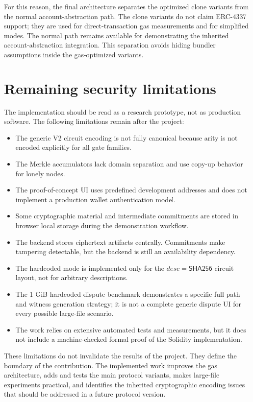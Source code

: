 For this reason, the final architecture separates the optimized clone variants from the
normal account-abstraction path. The clone variants do not claim ERC-4337 support; they are
used for direct-transaction gas measurements and for simplified modes. The normal path
remains available for demonstrating the inherited account-abstraction integration. This
separation avoids hiding bundler assumptions inside the gas-optimized variants.

\section{Remaining security limitations}

The implementation should be read as a research prototype, not as production software. The
following limitations remain after the project:

\begin{itemize}
  \item The generic V2 circuit encoding is not fully canonical because arity is not encoded
  explicitly for all gate families.
  \item The Merkle accumulators lack domain separation and use copy-up behavior for lonely
  nodes.
  \item The proof-of-concept UI uses predefined development addresses and does not implement
  a production wallet authentication model.
  \item Some cryptographic material and intermediate commitments are stored in browser local
  storage during the demonstration workflow.
  \item The backend stores ciphertext artifacts centrally. Commitments make tampering
  detectable, but the backend is still an availability dependency.
  \item The hardcoded mode is implemented only for the \(desc=\mathsf{SHA256}\) circuit
  layout, not for arbitrary descriptions.
  \item The 1 GiB hardcoded dispute benchmark demonstrates a specific full path and witness
  generation strategy; it is not a complete generic dispute UI for every possible large-file
  scenario.
  \item The work relies on extensive automated tests and measurements, but it does not
  include a machine-checked formal proof of the Solidity implementation.
\end{itemize}

These limitations do not invalidate the results of the project. They define the boundary of
the contribution. The implemented work improves the gas architecture, adds and tests the
main protocol variants, makes large-file experiments practical, and identifies the inherited
cryptographic encoding issues that should be addressed in a future protocol version.
